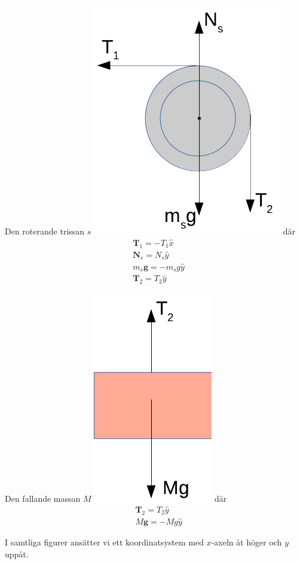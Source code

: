 \documentclass[11pt]{article}
\begin{document}
Den roterande trissan \(s\) \includegraphics{./BF18_17sf.png} där
\begin{align}
&\mathbf{T}_1 =-T_1\hat{x} \\
&\mathbf{N}_s =N_s\hat{y} \\
&m_s\mathbf{g} =-m_sg\hat{y} \\
&\mathbf{T}_2 =T_2\hat{y}
\end{align}

Den fallande massan \(M\) \includegraphics{./BF18_17mmf.png} där
\begin{align}
&\mathbf{T}_2 =T_2\hat{y} \\
&M\mathbf{g} =-Mg\hat{y}
\end{align}

I samtliga figurer ansätter vi ett koordinatsystem med \(x\)-axeln åt
höger och \(y\) uppåt.
\end{document}
